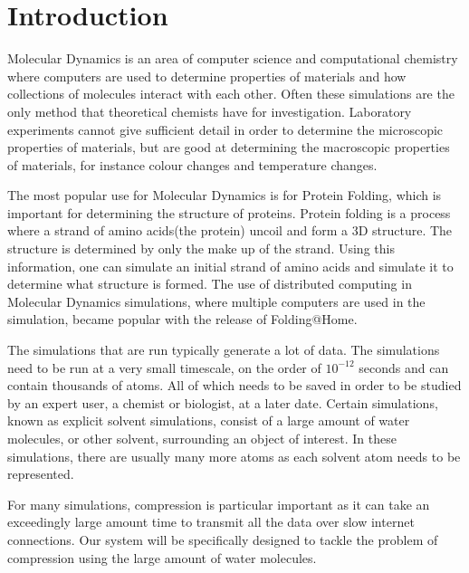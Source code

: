 \documentclass[a4paper,11pt]{report}
\begin{document}
\begin{titlepage}
 
\end{titlepage}

\begin{abstract}
 
\end{abstract}

\tableofcontents

\chapter{Introduction}

Molecular Dynamics is an area of computer science and computational chemistry where computers are used to determine properties of materials and how collections of molecules interact with each other. Often these simulations are the only method that theoretical chemists have for investigation. Laboratory experiments cannot give sufficient detail in order to determine the microscopic properties of materials, but are good at determining the macroscopic properties of materials, for instance colour changes and temperature changes.

The most popular use for Molecular Dynamics is for Protein Folding, which is important for determining the structure of proteins. Protein folding is a process where a strand of amino acids(the protein) uncoil and form a 3D structure. The structure is determined by only the make up of the strand. Using this information, one can simulate an initial strand of amino acids and simulate it to determine what structure is formed. The use of distributed computing in Molecular Dynamics simulations, where multiple computers are used in the simulation, became popular with the release of Folding@Home.

The simulations that are run typically generate a lot of data. The simulations need to be run at a very small timescale, on the order of $10^{-12}$ seconds and can contain thousands of atoms. All of which needs to be saved in order to be studied by an expert user, a chemist or biologist, at a later date. Certain simulations, known as explicit solvent simulations, consist of a large amount of water molecules, or other solvent, surrounding an object of interest. In these simulations, there are usually many more atoms as each solvent atom needs to be represented.

For many simulations, compression is particular important as it can take an exceedingly large amount time to transmit all the data over slow internet connections. Our system will be specifically designed to tackle the problem of compression using the large amount of water molecules.
\end{document}
